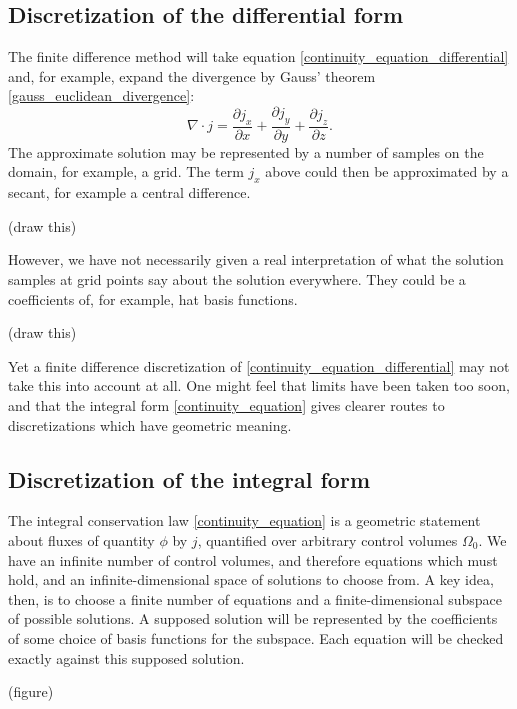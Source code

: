 \documentclass[11pt,a4paper]{memoir}
\newcommand{\Part}[2]{\frac{\partial #1}{\partial #2}}
\begin{document}
\subsection{Discretization of the differential form}
The finite difference method will take equation \eqref{continuity_equation_differential} and, for example, expand the divergence by Gauss' theorem
\eqref{gauss_euclidean_divergence}:
$$
    \nabla \cdot j = \Part{j_x}{x} + \Part{j_y}{y} + \Part{j_z}{z}.
$$
The approximate solution may be represented by a number of samples on the domain, for example, a grid. The term
$j_x$ above could then be approximated by a secant, for example a central difference.

\vskip 0.2in
(draw this)
\vskip 0.2in

However, we have not necessarily given a real interpretation of what the solution samples at grid points say about the solution everywhere.
They could be a coefficients of, for example, hat basis functions.

\vskip 0.2in
(draw this)
\vskip 0.2in

Yet a finite difference discretization of \eqref{continuity_equation_differential} may not take this into account at all. One might feel that
limits have been taken too soon, and that the integral form \eqref{continuity_equation} gives clearer routes to discretizations which
have geometric meaning.

\subsection{Discretization of the integral form}
The integral conservation law \eqref{continuity_equation} is a geometric statement about fluxes
of quantity $\phi$ by $j$, quantified over arbitrary control volumes $\Omega_0$.
We have an infinite number of control volumes, and therefore equations which must hold, and an infinite-dimensional
space of solutions to choose from. A key idea, then, is to choose a finite number of equations and a finite-dimensional subspace of possible solutions.
A supposed solution will be represented by the coefficients of some choice of basis functions for the subspace. Each equation will be checked exactly against this supposed solution.

\vskip 0.2in
(figure)
\vskip 0.2in
\end{document}
